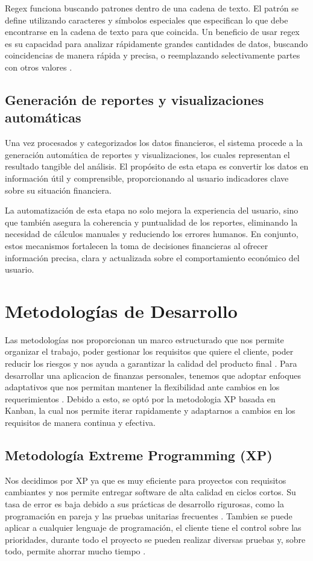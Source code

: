 Regex funciona buscando patrones dentro de una cadena de texto. El patrón se define utilizando caracteres y símbolos especiales que especifican lo que debe encontrarse en la cadena de texto para que coincida. 
Un beneficio de usar regex es su capacidad para analizar rápidamente grandes cantidades de datos, buscando coincidencias de manera rápida y precisa, o reemplazando selectivamente partes con otros valores \cite{WhyRegex}.

\subsection{Generación de reportes y visualizaciones automáticas}
Una vez procesados y categorizados los datos financieros, el sistema procede a la generación automática de reportes y visualizaciones, los cuales representan el resultado
tangible del análisis. El propósito de esta etapa es convertir los datos en información útil y comprensible, proporcionando al usuario indicadores clave sobre su situación 
financiera.

La automatización de esta etapa no solo mejora la experiencia del usuario, sino que también asegura la coherencia y puntualidad de los reportes, eliminando la necesidad de 
cálculos manuales y reduciendo los errores humanos.
En conjunto, estos mecanismos fortalecen la toma de decisiones financieras al ofrecer información precisa, clara y actualizada sobre el comportamiento económico del usuario.

\section{Metodologías de Desarrollo}
Las metodologías nos proporcionan un marco estructurado que nos permite organizar el trabajo, poder gestionar los requisitos que quiere el cliente,
poder reducir los riesgos y nos ayuda a garantizar la calidad del producto final \cite{Metodologias}.
Para desarrollar una aplicacion de finanzas personales, tenemos que adoptar enfoques adaptativos que nos permitan mantener la flexibilidad ante cambios
en los requerimientos \cite{ManifestoAgil}. Debido a esto, se optó por la metodologia XP basada en Kanban, la cual nos permite iterar rapidamente y adaptarnos a cambios
en los requisitos de manera continua y efectiva.

\subsection{Metodología Extreme Programming (XP)}
Nos decidimos por XP ya que es muy eficiente para proyectos con requisitos cambiantes y nos permite entregar software de alta calidad en ciclos cortos.
Su tasa de error es baja debido a sus prácticas de desarrollo rigurosas, como la programación en pareja y las pruebas unitarias frecuentes \cite{WhyXP}.
Tambien se puede aplicar a cualquier lenguaje de programación, el cliente tiene el control sobre las prioridades, durante todo el proyecto se pueden realizar
diversas pruebas y, sobre todo, permite ahorrar mucho tiempo \cite{WhyXP}.

